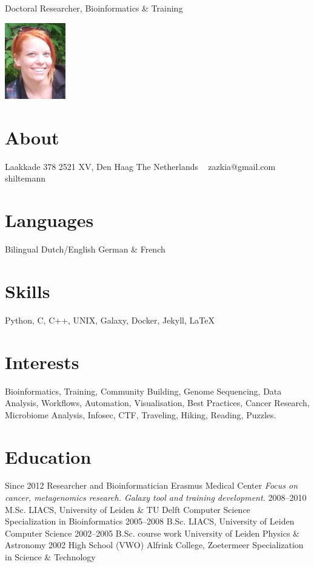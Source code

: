 \documentclass[]{shiltemann-cv}
\begin{document}
       {Doctoral Researcher, Bioinformatics \& Training}


\begin{aside}
  \includegraphics[width=75pt]{foto.jpg}
  \section{About}
    Laakkade 378
    2521 XV, Den Haag
    The Netherlands
    ~
    zazkia@gmail.com \faEnvelope
    shiltemann \faGithub \ \faTwitter \ \faLinkedin
    \
  \section{Languages}
    Bilingual Dutch/English
    German \& French
  \section{Skills}
    Python, C, C++, UNIX, Galaxy, Docker, Jekyll, LaTeX
\end{aside}

\section{Interests}

Bioinformatics, Training, Community Building, Genome Sequencing, Data Analysis, Workflows, Automation, Visualisation, Best Practices, Cancer Research, Microbiome Analysis, Infosec, CTF, Traveling, Hiking, Reading, Puzzles.

\section{Education}

\begin{entrylist}
  \entry
    {Since 2012}
    {Researcher and Bioinformatician}
    {Erasmus Medical Center}
    {\emph{Focus on cancer, metagenomics research. Galaxy tool and training development.}}
  \entry
    {2008–2010}
    {M.Sc.}
    {LIACS, University of Leiden \& TU Delft}
    {Computer Science\\
    Specialization in Bioinformatics}
  \entry
    {2005–2008}
    {B.Sc.}
    {LIACS, University of Leiden}
    {Computer Science}
  \entry
    {2002–2005}
    {B.Sc. course work}
    {University of Leiden}
    {Physics \& Astronomy}
  \entry
    {2002}
    {High School (VWO)}
    {Alfrink College, Zoetermeer}
    {Specialization in Science \& Technology}
\end{entrylist}
\end{document}
